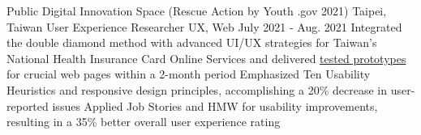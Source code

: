 
\resumeExpEntry
{Public Digital Innovation Space (Rescue Action by Youth .gov 2021)}
{Taipei, Taiwan}
{User Experience Researcher}
{UX, Web}
{July 2021 - Aug. 2021}
{
  \resumeItemListStart
    \resumeItem
    {Integrated the double diamond method with advanced UI/UX strategies for Taiwan's National Health Insurance Card Online Services and delivered \href{https://ray2021.pdis.nat.gov.tw/en/health_insurance}{tested prototypes} for crucial web pages within a 2-month period}
    \resumeItem
    {Emphasized Ten Usability Heuristics and responsive design principles, accomplishing a 20\% decrease in user-reported issues}
    \resumeItem
    {Applied Job Stories and HMW for usability improvements, resulting in a 35\% better overall user experience rating}
  \resumeItemListEnd
}
